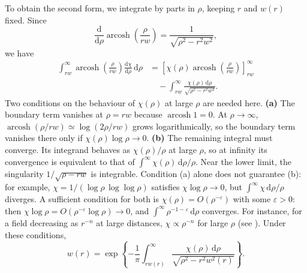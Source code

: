 \begin{problem}[title={Repulsive field from cross-section (Firsov)}]
{To obtain the second form, we integrate by parts in $\rho$, keeping $r$ and $w(r)$ fixed. Since
\begin{equation*}
    \frac{\mathrm{d}}{\mathrm{d}\rho}\operatorname{arcosh}\left( \frac{\rho}{rw} \right) = \frac{1}{\sqrt{\rho^2 - r^2w^2}},
\end{equation*}
we have
\begin{align*}
    \int_{rw}^\infty \operatorname{arcosh}\left( \frac{\rho}{rw} \right)\frac{\mathrm{d}\chi}{\mathrm{d}\rho}\,\mathrm{d}\rho &= \left[ \chi(\rho)\operatorname{arcosh}\left( \frac{\rho}{rw} \right) \right]_{rw}^\infty \\
    &\quad - \int_{rw}^\infty \frac{\chi(\rho)\,\mathrm{d}\rho}{\sqrt{\rho^2 - r^2w^2}}.
\end{align*}
Two conditions on the behaviour of $\chi(\rho)$ at large $\rho$ are needed here. \textbf{(a)} The boundary term vanishes at $\rho = rw$ because $\operatorname{arcosh}{1} = 0$. At $\rho \to \infty$, $\operatorname{arcosh}(\rho/rw) \simeq \log(2\rho/rw)$ grows logarithmically, so the boundary term vanishes there only if $\chi(\rho)\log{\rho} \to 0$. \textbf{(b)} The remaining integral must converge. Its integrand behaves as $\chi(\rho)/\rho$ at large $\rho$, so at infinity its convergence is equivalent to that of $\int^\infty \chi(\rho)\,\mathrm{d}\rho/\rho$. Near the lower limit, the singularity $1/\sqrt{\rho - rw}$ is integrable.
Condition (a) alone does not guarantee (b): for example, $\chi = 1/(\log{\rho}\,\log\log{\rho})$ satisfies $\chi\log{\rho} \to 0$, but $\int^\infty \chi\,\mathrm{d}\rho/\rho$ diverges. A sufficient condition for both is $\chi(\rho) = O(\rho^{-\varepsilon})$ with some $\varepsilon > 0$: then $\chi\log{\rho} = O(\rho^{-\varepsilon}\log{\rho}) \to 0$, and $\int^\infty \rho^{-1-\varepsilon}\,\mathrm{d}\rho$ converges. For instance, for a field decreasing as $r^{-n}$ at large distances, $\chi \propto \rho^{-n}$ for large $\rho$ (see ). Under these conditions,
\begin{equation*}
    w(r) = \exp{\left\{ -\frac{1}{\pi}\int_{rw(r)}^\infty \frac{\chi(\rho)\,\mathrm{d}\rho}{\sqrt{\rho^2 - r^2w^2(r)}} \right\}}.
\end{equation*}

}
\end{problem}
